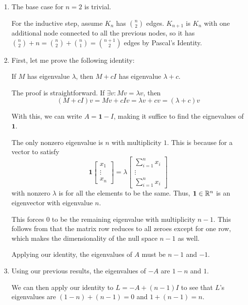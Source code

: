 \documentclass[12pt]{article}
\begin{document}
\begin{enumerate}
    \item The base case for $n=2$ is trivial.

          For the inductive step, assume $K_n$ has $\binom{n}{2}$ edges.
          $K_{n+1}$ is $K_n$ with one additional node connected to all the previous
          nodes, so it has $\binom{n}{2}+n=\binom{n}{2}+\binom{n}{1}=\binom{n+1}{2}$ edges
          by Pascal's Identity.

    \item First, let me prove the following identity:
          \begin{center}
              If $M$ has eigenvalue $\lambda$, then $M+cI$ has eigenvalue $\lambda+c$.
          \end{center}
          The proof is straightforward.
          If $\exists v: Mv=\lambda v$, then
          \[(M+cI)v=Mv+cIv=\lambda v + cv=(\lambda+c)v\]

          With this, we can write $A=\mathbf{1}-I$, making it suffice to find the eignevalues of $\mathbf{1}$.

          The only nonzero eigenvalue is $n$ with multiplicity $1$.
          This is because for a vector to satisfy
          \[\mathbf{1}\begin{bmatrix}
                  x_1 \\ \vdots \\ x_n
              \end{bmatrix}=\lambda\begin{bmatrix}
                  \sum_{i=1}^{n} x_i \\ \vdots \\ \sum_{i=1}^{n} x_i
              \end{bmatrix}\]
          with nonzero $\lambda$ is for all the elements to be the same.
          Thus, $\mathbf{1} \in \mathbb{R}^n$ is an eigenvector with eigenvalue $n$.

          This forces $0$ to be the remaining eigenvalue with multiplicity $n-1$.
          This follows from that the matrix row reduces to all zeroes except for one row,
          which makes the dimensionality of the null space $n-1$ as well.

          Applying our identity, the eigenvalues of $A$ must be $\boxed{n-1}$ and $\boxed{-1}$.

    \item Using our previous results, the eigenvalues of $-A$ are $1-n$ and $1$.

          We can then apply our identity to $L=-A+(n-1)I$ to see that $L$'s eigenvalues are
          $(1-n)+(n-1)=\boxed{0}$ and $1+(n-1)=\boxed{n}$.
\end{enumerate}
\end{document}
